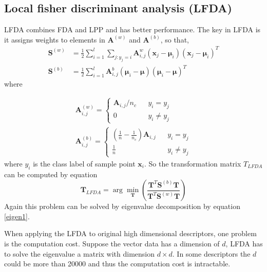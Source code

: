 \subsection{Local fisher discriminant analysis (LFDA)}
\indent LFDA \cite{LFDA} combines FDA and LPP and has better performance. The key in LFDA is it assigns weights to elements in $\bm{A}^{(w)}$ and $\bm{A}^{(b)}$, so that,
\begin{equation}
\begin{aligned}
\bm{S}^{(w)} &= \frac{1}{2}\sum _{i=1}^l\sum_{j:y_j = i} \bm{A}_{i,j}^w (\bm{x}_j - \bm{\mu}_i)(\bm{x}_j - \bm{\mu}_i)^T \\
\bm{S}^{(b)} &=  \frac{1}{2}\sum _{i=1}^l \bm{A}_{i,j}^b(\bm{\mu}_i - \bm{\mu})(\bm{\mu}_i - \bm{\mu})^T
\end{aligned}
\end{equation}
where 

\begin{equation}
\begin{aligned}
\bm{A}_{i,j}^{(w)} = \left \{ 
\begin{array}{rcl}
\bm{A}_{i,j}/n_c &  &y_i = y_j \\
0 & & {y_i \ne y_j }
\end{array}
  \right.  \\
  \bm{A}_{i,j}^{(b)} = \left \{ 
\begin{array}{rcl}
(\frac{1}{n} - \frac{1}{n_c})  \bm{A}_{i,j} &  &{y_i = y_j }\\
\frac{1}{n} & & {y_i \ne y_j }
\end{array}
  \right. 
 \end{aligned}
\end{equation}
where $y_i$ is the class label of sample point $\bm{x}_i$. So the transformation matrix $T_{LFDA}$ can be computed by equation
\begin{equation}\label{eigencompute1} 
\bm{T}_{LFDA}  = \arg\min_{\bm{T}} (\frac{\bm{T}^T\bm{S}^{(b)}\bm{T}}{\bm{T}^T\bm{S}^{(w)}\bm{T}})
\end{equation}
Again this problem can be solved by eigenvalue decomposition by equation \ref{eigen1}. 



When applying the LFDA to original high dimensional descriptors, one problem is the computation cost. Suppose the vector data has a dimension of $d$, LFDA has to solve the eigenvalue a matrix with dimension $d\times d$. In some descriptors the $d$ could be more than 20000 and thus the computation cost is intractable. 
 

